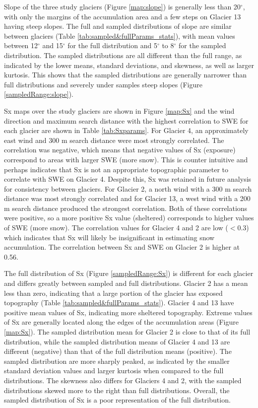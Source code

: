 \documentclass[12pt]{article}
\begin{document}
Slope of the three study glaciers (Figure \ref{map:slope}) is generally less than 20$^{\circ}$, with only the margins of the accumulation area and a few steps on Glacier 13 having steep slopes. The full and sampled distributions of slope are similar between glaciers (Table \ref{tab:sampled&fullParams_stats}), with mean values between 12$^{\circ}$ and 15$^{\circ}$ for the full distribution and 5$^{\circ}$ to 8$^{\circ}$ for the sampled distribution. The sampled distributions are all different than the full range, as indicated by the lower means, standard deviations, and skewness, as well as larger kurtosis. This shows that the sampled distributions are generally narrower than full distributions and severely under samples steep slopes (Figure \ref{sampledRange:slope}).


Sx maps over the study glaciers are shown in Figure \ref{map:Sx} and the wind direction and maximum search distance with the highest correlation to SWE for each glacier are shown in Table \ref{tab:Sxparams}. For Glacier 4, an approximately east wind and 300 m search distance were most strongly correlated. The correlation was negative, which means that negative values of Sx (exposure) correspond to areas with larger SWE (more snow). This is counter intuitive and perhaps indicates that Sx is not an appropriate topographic parameter to correlate with SWE on Glacier 4. Despite this, Sx was retained in future analysis for consistency between glaciers. For Glacier 2, a north wind with a 300 m search distance was most strongly correlated and for Glacier 13, a west wind with a 200 m search distance produced the strongest correlation. Both of these correlations were positive, so a more positive Sx value (sheltered) corresponds to higher values of SWE (more snow). The correlation values for Glacier 4 and 2 are low ($<$0.3) which indicates that Sx will likely be insignificant in estimating snow accumulation. The correlation between Sx and SWE on Glacier 2 is higher at 0.56. 

The full distribution of Sx (Figure \ref{sampledRange:Sx}) is different for each glacier and differs greatly between sampled and full distributions. Glacier 2 has a mean less than zero, indicating that a large portion of the glacier has exposed topography (Table \ref{tab:sampled&fullParams_stats}). Glacier 4 and 13 have positive mean values of Sx, indicating more sheltered topography. Extreme values of Sx are generally located along the edges of the accumulation areas (Figure \ref{map:Sx}). The sampled distribution mean for Glacier 2 is close to that of its full distribution, while the sampled distribution means of Glacier 4 and 13 are different (negative) than that of the full distribution means (positive). The sampled distribution are more sharply peaked, as indicated by the smaller standard deviation values and larger kurtosis when compared to the full distributions. The skewness also differs for Glaciers 4 and 2, with the sampled distributions skewed more to the right than full distributions. Overall, the sampled distribution of Sx is a poor representation of the full distribution. 
\end{document}
